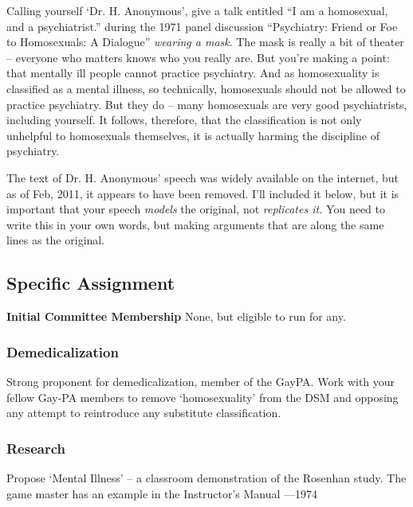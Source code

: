 \begin{refsection}
Calling yourself `Dr. H. Anonymous', give a talk entitled “I am a homosexual, and a psychiatrist.” during the 1971 panel discussion “Psychiatry: Friend or Foe to Homosexuals: A Dialogue” \emph{wearing a mask}. The mask is really a bit of theater – everyone who matters knows who you really are. But you're making a point: that mentally ill people cannot practice psychiatry. And as homosexuality is classified as a mental illness, so technically, homosexuals should not be allowed to practice psychiatry. But they do – many homosexuals are very good psychiatrists, including yourself. It follows, therefore, that the classification is not only unhelpful to homosexuals themselves, it is actually harming the discipline of psychiatry.

The text of Dr. H. Anonymous' speech was widely available on the internet, but as of Feb, 2011, it appears to have been removed. I'll included it below, but it is important that your speech \emph{models} the original, not \emph{replicates it.} You need to write this in your own words, but making arguments that are along the same lines as the original.

\subsection{Specific Assignment}
\label{specificassignment}

\textbf{Initial Committee Membership}
None, but eligible to run for any.

\subsubsection{Demedicalization}
\label{demedicalization}

Strong proponent for demedicalization, member of the GayPA. Work with your fellow Gay-PA members to remove `homosexuality' from the DSM and opposing any attempt to reintroduce any substitute classification.

\subsubsection{Research}
\label{research}

\begin{researchtask}[Fryer]\label{researchtask:fryer}Propose ‘Mental Illness’ -- a classroom demonstration of the Rosenhan study. The game master has an example  in the Instructor’s Manual ---1974\end{researchtask}


\end{refsection}
